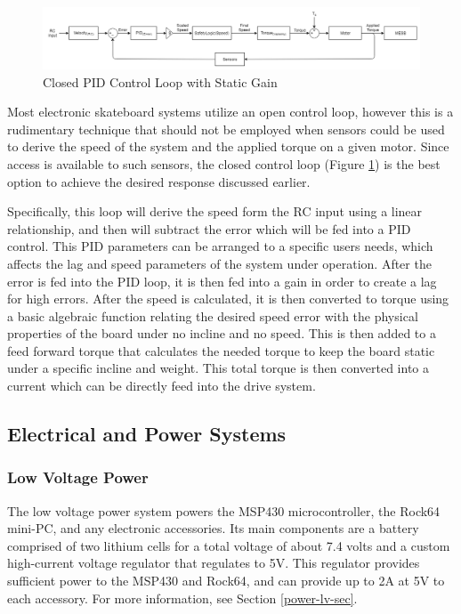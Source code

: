 \documentclass[letterpaper,12pt]{article}
\begin{document}
\begin{figure}[!htbp]\centering
\includegraphics[width=\textwidth,height=\textheight,keepaspectratio]{ControlFigs/ClosedLoop.png}
\caption{Closed PID Control Loop with Static Gain}
\label{ClosedPP}
\end{figure}

Most electronic skateboard systems utilize an open control loop, however this is a rudimentary technique that should not be employed when sensors could be used to derive the speed of the system and the applied torque on a given motor. Since access is available to such sensors, the closed control loop (Figure \ref{ClosedPP}) is the best option to achieve the desired response discussed earlier.

Specifically, this loop will derive the speed form the RC input using a linear relationship, and then will subtract the error which will be fed into a PID control. This PID parameters can be arranged to a specific users needs, which affects the lag and speed parameters of the system under operation. After the error is fed into the PID loop, it is then fed into a gain in order to create a lag for high errors. After the speed is calculated, it is then converted to torque using a basic algebraic function relating the desired speed error with the physical properties of the board under no incline and no speed. This is then added to a feed forward torque that calculates the needed torque to keep the board static under a specific incline and weight. This total torque is then converted into a current which can be directly feed into the drive system.

\subsection{Electrical and Power Systems}
\subsubsection{Low Voltage Power}
The low voltage power system powers the MSP430 microcontroller, the Rock64 mini-PC, and any electronic accessories. Its main components are a battery comprised of two lithium cells for a total voltage of about 7.4 volts and a custom high-current voltage regulator that regulates to 5V. This regulator provides sufficient power to the MSP430 and Rock64, and can provide up to 2A at 5V to each accessory. For more information, see Section \ref{power-lv-sec}.
\end{document}

